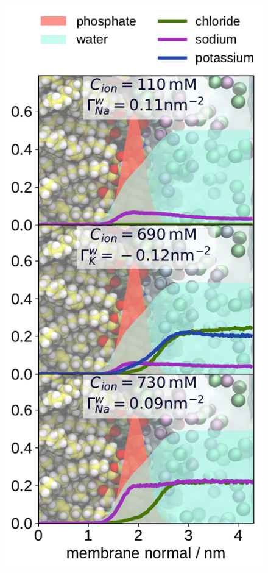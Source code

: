 \begin{figure}[tbp!] 
  \centering 
  \includegraphics[width=\figwidth]{../img/ecc_pops/density_profiles_na_k_cl_wat_phos_models-compar_4-6_NaCl-and-KCl-series.pdf}

\end{figure}
